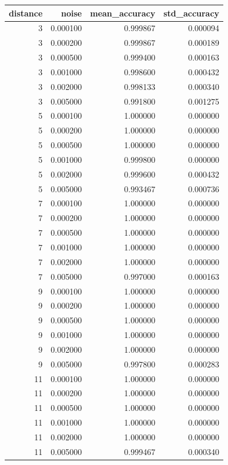 \begin{tabular}{rrrr}
\toprule
distance & noise & mean_accuracy & std_accuracy \\
\midrule
3 & 0.000100 & 0.999867 & 0.000094 \\
3 & 0.000200 & 0.999867 & 0.000189 \\
3 & 0.000500 & 0.999400 & 0.000163 \\
3 & 0.001000 & 0.998600 & 0.000432 \\
3 & 0.002000 & 0.998133 & 0.000340 \\
3 & 0.005000 & 0.991800 & 0.001275 \\
5 & 0.000100 & 1.000000 & 0.000000 \\
5 & 0.000200 & 1.000000 & 0.000000 \\
5 & 0.000500 & 1.000000 & 0.000000 \\
5 & 0.001000 & 0.999800 & 0.000000 \\
5 & 0.002000 & 0.999600 & 0.000432 \\
5 & 0.005000 & 0.993467 & 0.000736 \\
7 & 0.000100 & 1.000000 & 0.000000 \\
7 & 0.000200 & 1.000000 & 0.000000 \\
7 & 0.000500 & 1.000000 & 0.000000 \\
7 & 0.001000 & 1.000000 & 0.000000 \\
7 & 0.002000 & 1.000000 & 0.000000 \\
7 & 0.005000 & 0.997000 & 0.000163 \\
9 & 0.000100 & 1.000000 & 0.000000 \\
9 & 0.000200 & 1.000000 & 0.000000 \\
9 & 0.000500 & 1.000000 & 0.000000 \\
9 & 0.001000 & 1.000000 & 0.000000 \\
9 & 0.002000 & 1.000000 & 0.000000 \\
9 & 0.005000 & 0.997800 & 0.000283 \\
11 & 0.000100 & 1.000000 & 0.000000 \\
11 & 0.000200 & 1.000000 & 0.000000 \\
11 & 0.000500 & 1.000000 & 0.000000 \\
11 & 0.001000 & 1.000000 & 0.000000 \\
11 & 0.002000 & 1.000000 & 0.000000 \\
11 & 0.005000 & 0.999467 & 0.000340 \\
\bottomrule
\end{tabular}
